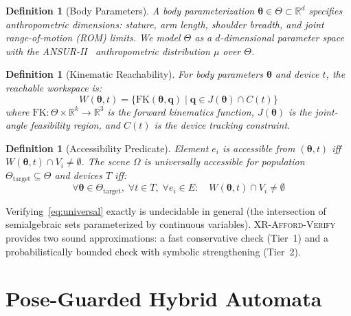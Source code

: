 \documentclass[11pt,letterpaper]{article}
\newtheorem{definition}[theorem]{Definition}
\newcommand{\tool}{\textsc{XR-Afford-Verify}}
\newcommand{\R}{\mathbb{R}}
\newcommand{\FK}{\mathrm{FK}}
\newcommand{\scene}{\Omega}
\newcommand{\param}{\Theta}
\newcommand{\bodyp}{\boldsymbol{\theta}}
\newcommand{\joint}{\mathbf{q}}
\begin{document}
\begin{definition}[Body Parameters]
A body parameterization $\bodyp \in \param \subset \R^d$ specifies anthropometric dimensions: stature, arm length, shoulder breadth, and joint range-of-motion (ROM) limits.
We model $\param$ as a $d$-dimensional parameter space with the ANSUR-II~\cite{ansur2014} anthropometric distribution $\mu$ over $\param$.
\end{definition}

\begin{definition}[Kinematic Reachability]
For body parameters $\bodyp$ and device $t$, the \emph{reachable workspace} is:
\begin{equation}
W(\bodyp, t) = \bigl\{ \FK(\bodyp, \joint) \mid \joint \in J(\bodyp) \cap C(t) \bigr\}
\end{equation}
where $\FK: \param \times \R^k \to \R^3$ is the forward kinematics function, $J(\bodyp)$ is the joint-angle feasibility region, and $C(t)$ is the device tracking constraint.
\end{definition}

\begin{definition}[Accessibility Predicate]
Element $e_i$ is \emph{accessible} from $(\bodyp, t)$ iff $W(\bodyp, t) \cap V_i \neq \emptyset$.
The scene $\scene$ is \emph{universally accessible} for population $\param_{\mathrm{target}} \subseteq \param$ and devices $T$ iff:
\begin{equation}
\forall \bodyp \in \param_{\mathrm{target}},\; \forall t \in T,\; \forall e_i \in E: \quad W(\bodyp, t) \cap V_i \neq \emptyset
\label{eq:universal}
\end{equation}
\end{definition}

Verifying~\eqref{eq:universal} exactly is undecidable in general (the intersection of semialgebraic sets parameterized by continuous variables).
\tool{} provides two sound approximations: a fast conservative check (Tier~1) and a probabilistically bounded check with symbolic strengthening (Tier~2).

\section{Pose-Guarded Hybrid Automata}
\label{sec:pgha}
\end{document}
